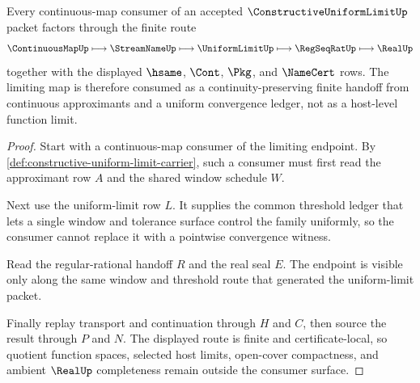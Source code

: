 \begin{theorem}
\label{thm:constructive-uniform-limit-continuous-route}
Every continuous-map consumer of an accepted $\ConstructiveUniformLimitUp$ packet factors through the finite route
$$
\ContinuousMapUp \longmapsto \StreamNameUp \longmapsto \UniformLimitUp \longmapsto \RegSeqRatUp \longmapsto \RealUp
$$
together with the displayed $\hsame$, $\Cont$, $\Pkg$, and $\NameCert$ rows. The limiting map is therefore consumed as a continuity-preserving finite handoff from continuous approximants and a uniform convergence ledger, not as a host-level function limit.
\end{theorem}
\begin{proof}
Start with a continuous-map consumer of the limiting endpoint. By \autoref{def:constructive-uniform-limit-carrier}, such a consumer must first read the approximant row $A$ and the shared window schedule $W$.

Next use the uniform-limit row $L$. It supplies the common threshold ledger that lets a single window and tolerance surface control the family uniformly, so the consumer cannot replace it with a pointwise convergence witness.

Read the regular-rational handoff $R$ and the real seal $E$. The endpoint is visible only along the same window and threshold route that generated the uniform-limit packet.

Finally replay transport and continuation through $H$ and $C$, then source the result through $P$ and $N$. The displayed route is finite and certificate-local, so quotient function spaces, selected host limits, open-cover compactness, and ambient $\RealUp$ completeness remain outside the consumer surface.
\end{proof}


